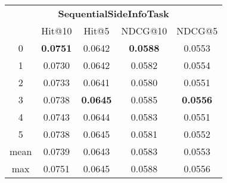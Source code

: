 \documentclass{article}
\begin{document}
 

\begin{tabular}{c|cccc}

\multicolumn{5}{c}{\textbf{SequentialSideInfoTask}} \\
\noalign{\smallskip}
\noalign{\smallskip}
\toprule
\multicolumn{1}{c}{Template ID} & \multicolumn{1}{|c}{Hit@10} & \multicolumn{1}{c}{Hit@5} & \multicolumn{1}{c}{NDCG@10} & \multicolumn{1}{c}{NDCG@5} \\
\midrule
0 & \textbf{0.0751} & 0.0642 & \textbf{0.0588} & 0.0553 \\
1 & 0.0730 & 0.0642 & 0.0582 & 0.0554 \\
2 & 0.0733 & 0.0641 & 0.0580 & 0.0551 \\
3 & 0.0738 & \textbf{0.0645} & 0.0585 & \textbf{0.0556} \\
4 & 0.0743 & 0.0644 & 0.0583 & 0.0551 \\
5 & 0.0738 & 0.0645 & 0.0581 & 0.0552 \\
\midrule
mean & 0.0739 & 0.0643 & 0.0583 & 0.0553 \\
max & 0.0751 & 0.0645 & 0.0588 & 0.0556 \\
\bottomrule

\end{tabular}
\end{document}
